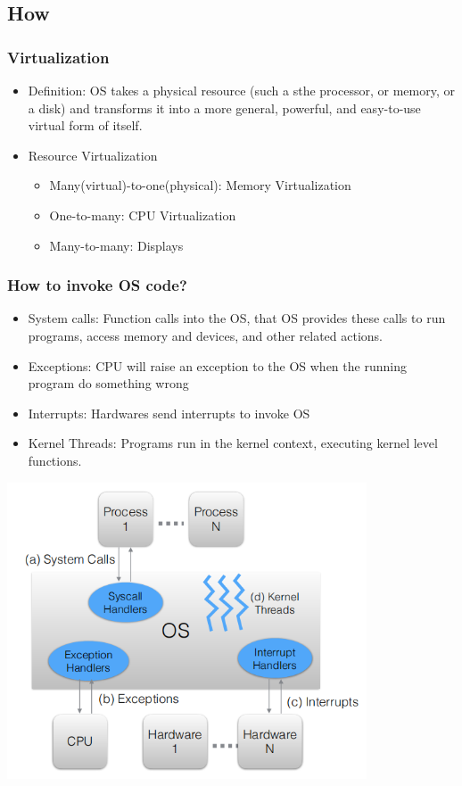 \documentclass[12pt]{article}
\begin{document}
\subsection{How}
\subsubsection{Virtualization}
\begin{itemize}
    \item Definition: OS takes a physical resource (such a sthe processor, or memory, or a disk) and transforms it into a more general, powerful, and easy-to-use virtual form of itself.
    \item Resource Virtualization \begin{itemize}
        \item Many(virtual)-to-one(physical): Memory Virtualization
        \item One-to-many: CPU Virtualization
        \item Many-to-many: Displays
    \end{itemize}
\end{itemize}
\subsubsection{How to invoke OS code?}
\begin{itemize}
    \item System calls: Function calls into the OS, that OS provides these calls to run programs, access memory and devices, and other related actions.
    \item Exceptions: CPU will raise an exception to the OS when the running program do something wrong
    \item Interrupts: Hardwares send interrupts to invoke OS
    \item Kernel Threads: Programs run in the kernel context, executing kernel level functions.
\end{itemize}
\includegraphics[width=0.8\textwidth]{FourWaysToInvokeOS.png}
\end{document}

